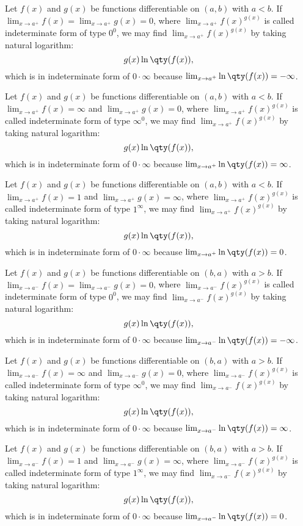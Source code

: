 \documentclass[a4paper,12pt]{report}
\begin{document}
\begin{itemize}
\begin{itemize}
Let $f(x)$ and $g(x)$ be functions differentiable on $(a,b)$ with $a<b$. If $\lim_{x\to a^+}f(x)=\lim_{x\to a^+}g(x)=0$, where $\lim_{x\to a^+}f(x)^{g(x)}$ is called indeterminate form of type $0^0$, we may find $\lim_{x\to a^+}f(x)^{g(x)}$ by taking natural logarithm:
\[g(x)\ln\qty(f(x)),\]
which is in indeterminate form of $0\cdot\infty$ because $\lim_{x\to a^+}\ln\qty(f(x))=-\infty$.

Let $f(x)$ and $g(x)$ be functions differentiable on $(a,b)$ with $a<b$. If $\lim_{x\to a^+}f(x)=\infty$ and $\lim_{x\to a^+}g(x)=0$, where $\lim_{x\to a^+}f(x)^{g(x)}$ is called indeterminate form of type $\infty^0$, we may find $\lim_{x\to a^+}f(x)^{g(x)}$ by taking natural logarithm:
\[g(x)\ln\qty(f(x)),\]
which is in indeterminate form of $0\cdot\infty$ because $\lim_{x\to a^+}\ln\qty(f(x))=\infty$.

Let $f(x)$ and $g(x)$ be functions differentiable on $(a,b)$ with $a<b$. If $\lim_{x\to a^+}f(x)=1$ and $\lim_{x\to a^+}g(x)=\infty$, where $\lim_{x\to a^+}f(x)^{g(x)}$ is called indeterminate form of type $1^{\infty}$, we may find $\lim_{x\to a^+}f(x)^{g(x)}$ by taking natural logarithm:
\[g(x)\ln\qty(f(x)),\]
which is in indeterminate form of $0\cdot\infty$ because $\lim_{x\to a^+}\ln\qty(f(x))=0$.

Let $f(x)$ and $g(x)$ be functions differentiable on $(b,a)$ with $a>b$. If $\lim_{x\to a^-}f(x)=\lim_{x\to a^-}g(x)=0$, where $\lim_{x\to a^-}f(x)^{g(x)}$ is called indeterminate form of type $0^0$, we may find $\lim_{x\to a^-}f(x)^{g(x)}$ by taking natural logarithm:
\[g(x)\ln\qty(f(x)),\]
which is in indeterminate form of $0\cdot\infty$ because $\lim_{x\to a^-}\ln\qty(f(x))=-\infty$.

Let $f(x)$ and $g(x)$ be functions differentiable on $(b,a)$ with $a>b$. If $\lim_{x\to a^-}f(x)=\infty$ and $\lim_{x\to a^-}g(x)=0$, where $\lim_{x\to a^-}f(x)^{g(x)}$ is called indeterminate form of type $\infty^0$, we may find $\lim_{x\to a^-}f(x)^{g(x)}$ by taking natural logarithm:
\[g(x)\ln\qty(f(x)),\]
which is in indeterminate form of $0\cdot\infty$ because $\lim_{x\to a^-}\ln\qty(f(x))=\infty$.

Let $f(x)$ and $g(x)$ be functions differentiable on $(b,a)$ with $a>b$. If $\lim_{x\to a^-}f(x)=1$ and $\lim_{x\to a^-}g(x)=\infty$, where $\lim_{x\to a^-}f(x)^{g(x)}$ is called indeterminate form of type $1^{\infty}$, we may find $\lim_{x\to a^-}f(x)^{g(x)}$ by taking natural logarithm:
\[g(x)\ln\qty(f(x)),\]
which is in indeterminate form of $0\cdot\infty$ because $\lim_{x\to a^-}\ln\qty(f(x))=0$.


\end{itemize}
\end{itemize}
\end{document}
